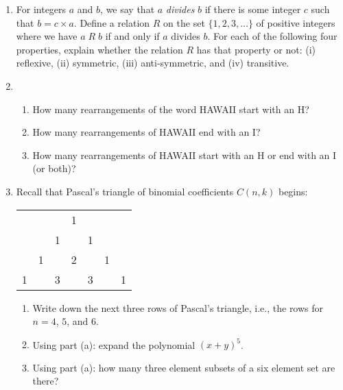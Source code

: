 \documentclass[11pt]{article}
\begin{document}
\begin{enumerate}
\item For integers $a$ and $b$, we say that $a$ \emph{divides} $b$ if there is some integer $c$ such that $b = c \times a$. Define a relation $R$ on the set $\{1,2,3,\ldots\}$ of positive integers where we have $a \; R \; b$ if and only if $a$ divides $b$. For each of the following four properties, explain whether the relation $R$ has that property or not: (i) reflexive, (ii) symmetric, (iii) anti-symmetric, and (iv) transitive.

\item \begin{enumerate}
\item How many rearrangements of the word HAWAII start with an H?
\item How many rearrangements of HAWAII end with an I?
\item How many rearrangements of HAWAII start with an H or end with an I (or both)?
\end{enumerate}

\item Recall that Pascal's triangle of binomial coefficients $C(n,k)$ begins:
\begin{center}
\begin{tabular}{c c c c c c c}
 & & & 1 & & & \\
 & & 1 & & 1 & & \\
 & 1 && 2 && 1 & \\
 1 && 3 && 3 && 1
\end{tabular}
\end{center}
\begin{enumerate}
\item Write down the next three rows of Pascal's triangle, i.e., the rows for $n=4$, $5$, and $6$.
\item Using part (a): expand the polynomial $(x+y)^5$.
\item Using part (a): how many three element subsets of a six element set are there?
\end{enumerate}

\end{enumerate}
\end{document}
